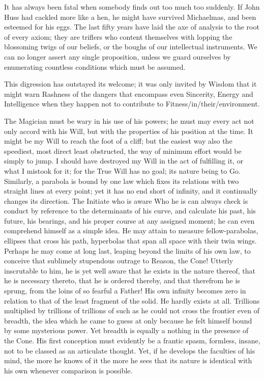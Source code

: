 It has always been fatal when somebody finds out too much too suddenly. If John Huss had cackled more like a hen, he might have survived Michaelmas, and been esteemed for his eggs. The last fifty years have laid the axe of analysis to the root of every axiom; they are triflers who content themselves with lopping the blossoming twigs of our beliefs, or the boughs of our intellectual instruments. We can no longer assert any single proposition, unless we guard ourselves by enumerating countless conditions which must be assumed.

This digression has outstayed its welcome; it was only invited by Wisdom that it might warn Rashness of the dangers that encompass even Sincerity, Energy and Intelligence when they happen not to contribute to Fitness\-/in\-/their\-/environment.

The Magician must be wary in his use of his powers; he must may every act not only accord with his Will, but with the properties of his position at the time. It might be my Will to reach the foot of a cliff; but the easiest way \textemdash{} also the speediest, most direct least obstructed, the way of minimum effort \textemdash{} would be simply to jump. I should have destroyed my Will in the act of fulfilling it, or what I mistook for it; for the True Will has no goal; its nature being to Go. Similarly, a parabola is bound by one law which fixes its relations with two straight lines at every point; yet it has no end short of infinity, and it continually changes its direction. The Initiate who is aware Who he is can always check is conduct by reference to the determinants of his curve, and calculate his past, his future, his bearings, and his proper course at any assigned moment; he can even comprehend himself as a simple idea. He may attain to measure fellow-parabolas, ellipses that cross his path, hyperbolas that span all space with their twin wings. Perhaps he may come at long last, leaping beyond the limits of his own law, to conceive that sublimely stupendous outrage to Reason, the Cone! Utterly inscrutable to him, he is yet well aware that he exists in the nature thereof, that he is necessary thereto, that he is ordered thereby, and that therefrom he is sprung, from the loins of so fearful a Father! His own infinity becomes zero in relation to that of the least fragment of the solid. He hardly exists at all. Trillions multiplied by trillions of trillions of such as he could not cross the frontier even of breadth, the idea which he came to guess at only because he felt himself bound by some mysterious power. Yet breadth is equally a nothing in the presence of the Cone. His first conception must evidently be a frantic spasm, formless, insane, not to be classed as an articulate thought. Yet, if he develops the faculties of his mind, the more he knows of it the more he sees that its nature is identical with his own whenever comparison is possible.


